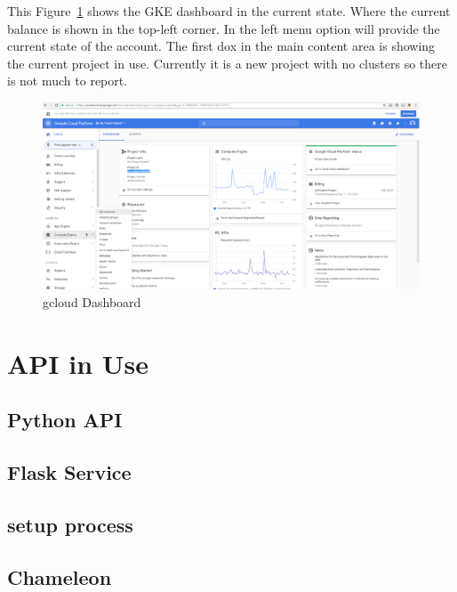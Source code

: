 This Figure~\ref{fig:gcloud-dashboard} shows the GKE dashboard in the current 
state. Where the current 
balance is shown in the top-left corner. In the left menu option will provide 
the current state of the account. The first dox in the main content area is 
showing the current project in use. Currently it is a new project with no
 clusters so there is not much to report.
 
 \begin{figure}[htb]
   \centering\includegraphics[width=\columnwidth]
         {images/hid_417_gcloud_browser.png}
   \caption{gcloud Dashboard}\label{fig:gcloud-dashboard}
 \end{figure}

 \section{API in Use}
\subsection{Python API}

\subsection{Flask Service}

\subsection{setup process}

\subsection{Chameleon}

